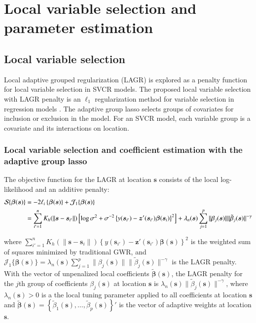 \documentclass[authoryear, review, 11pt]{elsarticle}
\begin{document}
\section{Local variable selection and parameter estimation \label{section:model-selection}}
	\subsection{Local variable selection}
	Local adaptive grouped regularization (LAGR) is explored as a penalty function for local variable selection in SVCR models. The proposed local variable selection with LAGR penalty is an $\ell_1$ regularization method for variable selection in regression models \citep{Wang-Leng-2008,Zou:2006}. The adaptive group lasso selects groups of covariates for inclusion or exclusion in the model. For an SVCR model, each variable group is a covariate and its interactions on location.
	
	\subsubsection{Local variable selection and coefficient estimation with the adaptive group lasso}
	The objective function for the LAGR at location $\bm{s}$ consists of the local log-likelihood and an additive penalty:%
	\begin{align}\label{eq:adaptive-lasso-WLS}
		\mathcal{S} \{ \bm{\beta}(\bm{s}) \} &= -2\ell_i\left\{ \bm{\beta}( \bm{s} ) \right\} + \mathcal{J}_1\{ \bm{\beta}(\bm{s}) \} \notag \\
		&= \sum_{i'=1}^n K_h( \| \bm{s} - \bm{s}_{i'} \| )  \left[ \log{\sigma^2}  + \sigma^{-2}  \left\{ y(\bm{s}_{i'}) - \bm{z}'(\bm{s}_{i'}) \bm{\beta}(\bm{s}_i) \right\}^2 \right] +  \lambda_n (\bm{s}) \sum_{j=1}^p \| \beta_j(\bm{s}) \| \| \tilde{\beta}_j(\bm{s}) \|^{-\gamma}
	\end{align}
	
	where $\sum_{i'=1}^n K_h( \| \bm{s} - \bm{s}_i \| ) \left\{ y(\bm{s}_{i'}) - \bm{z}'(\bm{s}_{i'}) \bm{\beta}(\bm{s}) \right\}^2$ is the weighted sum of squares minimized by traditional GWR, and $\mathcal{J}_1\{ \bm{\beta}(\bm{s}) \} = \lambda_n (\bm{s}) \sum_{j=1}^p \| \beta_j(\bm{s}) \| \| \tilde{\beta}_j(\bm{s}) \|^{-\gamma}$ is the LAGR penalty. With the vector of unpenalized local coefficients $\tilde{\bm{\beta}}(\bm{s})$, the LAGR penalty for the $j$th group of coefficients $\beta_j(\bm{s})$ at location $\bm{s}$ is $\lambda_n (\bm{s}) \| \tilde{\beta}_j(\bm{s}) \|^{-\gamma}$, where $\lambda_n (\bm{s}) > 0$ is a the local tuning parameter applied to all coefficients at location $\bm{s}$ and $\tilde{\bm{\beta}}(\bm{s}) = \left\{ \tilde{\beta}_1 (\bm{s}), \dots, \tilde{\beta}_p (\bm{s}) \right\}'$ is the vector of adaptive weights at location $\bm{s}$.
\end{document}
